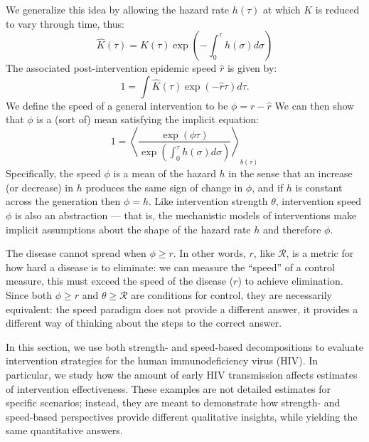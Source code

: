 \documentclass[12pt]{article}
\newcommand{\RR}{\ensuremath{{\mathcal R}}}
\newcommand{\rr}{\ensuremath{{r}}}
\newcommand{\eqlab}[1]{\label{eq:#1}}
\begin{document}
We generalize this idea by allowing the hazard rate $h(\tau)$ at which $K$ is reduced to vary through time, thus:
\begin{equation}
	\hat K(\tau) = K(\tau) \exp\left(-\int_0^\tau h(\sigma) d\sigma\right)
\end{equation}
The associated post-intervention epidemic speed $\hat r$ is given by:
\begin{equation}
	1 = \int \hat K(\tau) \exp(-\hat r\tau) d\tau.	
\end{equation}
We define the speed of a general intervention to be $\phi = r - \hat r$
We can then show that $\phi$ is a (sort of) mean satisfying the implicit equation:
\begin{equation}
	1 = \left\langle \frac{\exp(\phi \tau) }{\exp\left(\int_0^\tau h(\sigma) d\sigma\right)} \right\rangle_{b(\tau)}
	\eqlab{speedMean}
\end{equation}
Specifically, the speed $\phi$ is a mean of the hazard $h$ in the sense that an increase (or decrease) in $h$ produces the same sign of change in $\phi$, and if $h$ is constant across the generation then $\phi=h$.
Like intervention strength $\theta$, intervention speed $\phi$ is also an abstraction --- that is, the mechanistic models of interventions make implicit assumptions about the shape of the hazard rate $h$ and therefore $\phi$.

The disease cannot spread when $\phi \geq r$. In other words, \rr, like \RR, is a metric for how hard a disease is to eliminate: we can measure the ``speed'' of a control measure, this must exceed the speed of the disease (\rr) to achieve elimination. Since both $\phi \geq r$ and $\theta \geq \RR$ are conditions for control, they are necessarily equivalent: the speed paradigm does not provide a different answer, it provides a different way of thinking about the steps to the correct answer.


In this section, we use both strength- and speed-based decompositions to evaluate intervention strategies for the human immunodeficiency virus (HIV). 
In particular, we study how the amount of early HIV transmission affects estimates of intervention effectiveness. 
These examples are not detailed estimates for specific scenarios; 
instead, they are meant to demonstrate how strength- and speed-based perspectives provide different qualitative insights, while yielding the same quantitative answers.
\end{document}
